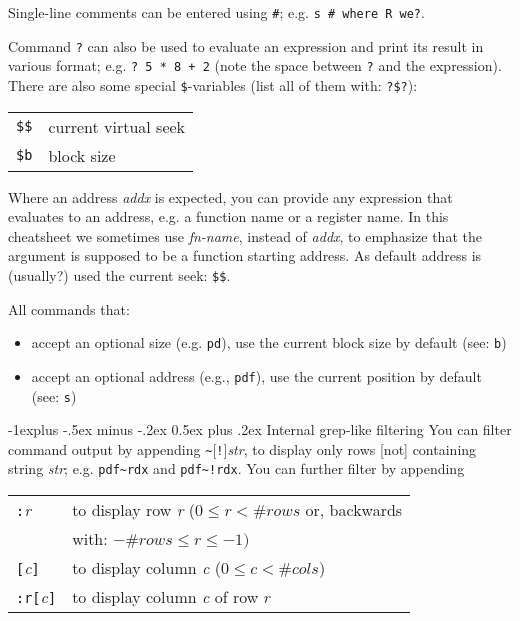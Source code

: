 \documentclass[a4paper,landscape]{article}
\makeatletter
\renewcommand{\subsection}{\@startsection{subsection}{2}{0mm}%
                                {-1explus -.5ex minus -.2ex}%
                                {0.5ex plus .2ex}%
                                {\normalfont\normalsize\bfseries}}
\makeatother
\begin{document}
\begin{multicols*}{3}
Single-line comments can be entered using \texttt{\#}; e.g. \texttt{s \# where R we?}.

Command \texttt{?} can also be used to evaluate an expression and print its result in various format; e.g. \texttt{? 5 * 8 + 2} (note the space between \texttt{?} and the expression).  There are also some special \texttt{\$}-variables
(list all of them with: \texttt{?\$?}):

\begin{tabular}{@{}ll@{}}
\texttt{\$\$} & current virtual seek \\
\texttt{\$b} & 	block size \\
\end{tabular}

Where an address \textit{addx} is expected, you can provide any expression that evaluates to an address,
e.g. a function name or a register name. In this cheatsheet we sometimes use \textit{fn-name}, instead of \textit{addx}, to emphasize that the argument is supposed to be a function starting address. As default address is (usually?) used the current seek: \texttt{\$\$}.

All commands that:
\begin{itemize}
\item accept an optional size (e.g. \texttt{pd}), use the current block size by default (see: \texttt{b})
\item accept an optional address (e.g., \texttt{pdf}), use the current position by default (see: \texttt{s})
\end{itemize}

\subsection{Internal grep-like filtering}
You can filter command output by appending \texttt{\textasciitilde{}}[\texttt{!}]\textit{str}, to display only rows [not] containing string \textit{str}; e.g. \texttt{pdf\textasciitilde{}rdx} and \texttt{pdf\textasciitilde{}!rdx}. You can further filter by appending

\begin{tabular}{@{}ll@{}}
\texttt{:}\textit{r}	& to display row \textit{r} ($0\le r < \#\mathit{rows}$ or, backwards \\ & with: $-\#\mathit{rows}\le r \le -1)$ \\
\texttt{[}\textit{c}\texttt{]}	& to display column \textit{c} ($0\le c < \#\mathit{cols}$) \\
\texttt{:r[}\textit{c}\texttt{]}	& to display column \textit{c} of row $r$
\end{tabular}


\end{multicols*}
\end{document}
